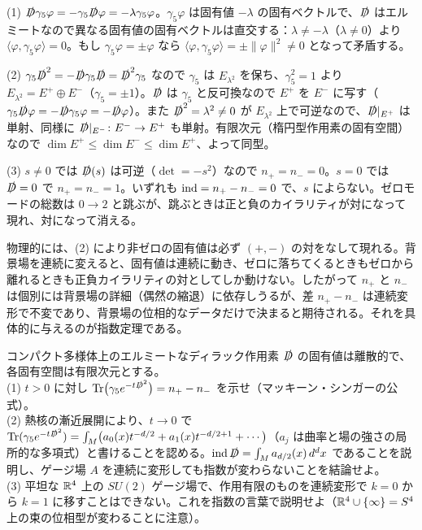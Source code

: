 \begin{solution}
(1) $\slashed D\gamma_5\varphi=-\gamma_5\slashed D\varphi=-\lambda\gamma_5\varphi$。$\gamma_5\varphi$ は固有値 $-\lambda$ の固有ベクトルで、$\slashed D$ はエルミートなので異なる固有値の固有ベクトルは直交する：$\lambda\neq-\lambda$（$\lambda\neq0$）より $\langle\varphi,\gamma_5\varphi\rangle=0$。もし $\gamma_5\varphi=\pm\varphi$ なら $\langle\varphi,\gamma_5\varphi\rangle=\pm\lVert\varphi\rVert^2\neq0$ となって矛盾する。

(2) $\gamma_5\slashed D^2=-\slashed D\gamma_5\slashed D=\slashed D^2\gamma_5$ なので $\gamma_5$ は $E_{\lambda^2}$ を保ち、$\gamma_5^2=1$ より $E_{\lambda^2}=E^+\oplus E^-$（$\gamma_5=\pm1$）。$\slashed D$ は $\gamma_5$ と反可換なので $E^+$ を $E^-$ に写す（$\gamma_5\slashed D\varphi=-\slashed D\gamma_5\varphi=-\slashed D\varphi$）。また $\slashed D^2=\lambda^2\ne0$ が $E_{\lambda^2}$ 上で可逆なので、$\slashed D|_{E^+}$ は単射、同様に $\slashed D|_{E^-}\colon E^-\to E^+$ も単射。有限次元（楕円型作用素の固有空間）なので $\dim E^+\le\dim E^-\le\dim E^+$、よって同型。

(3) $s\neq0$ では $\slashed D(s)$ は可逆（$\det=-s^2$）なので $n_+=n_-=0$。$s=0$ では $\slashed D=0$ で $n_+=n_-=1$。いずれも $\operatorname{ind}=n_+-n_-=0$ で、$s$ によらない。ゼロモードの総数は $0\to2$ と跳ぶが、跳ぶときは正と負のカイラリティが対になって現れ、対になって消える。

物理的には、(2) により非ゼロの固有値は必ず $(+,-)$ の対をなして現れる。背景場を連続に変えると、固有値は連続に動き、ゼロに落ちてくるときもゼロから離れるときも正負カイラリティの対としてしか動けない。したがって $n_+$ と $n_-$ は個別には背景場の詳細（偶然の縮退）に依存しうるが、差 $n_+-n_-$ は連続変形で不変であり、背景場の位相的なデータだけで決まると期待される。それを具体的に与えるのが指数定理である。
\end{solution}

\begin{problem}[難易度 B]\label{ch09-prob-mckean}
コンパクト多様体上のエルミートなディラック作用素 $\slashed D$ の固有値は離散的で、各固有空間は有限次元とする。\\
(1) $t>0$ に対し $\operatorname{Tr}\bigl(\gamma_5e^{-t\slashed D^2}\bigr)=n_+-n_-$ を示せ（マッキーン・シンガーの公式）。\\
(2) 熱核の漸近展開により、$t\to0$ で $\operatorname{Tr}(\gamma_5e^{-t\slashed D^2})=\int_M\bigl(a_0(x)t^{-d/2}+a_1(x)t^{-d/2+1}+\cdots\bigr)$（$a_j$ は曲率と場の強さの局所的な多項式）と書けることを認める。$\operatorname{ind}\slashed D=\int_Ma_{d/2}(x)\,d^dx$ であることを説明し、ゲージ場 $A$ を連続に変形しても指数が変わらないことを結論せよ。\\
(3) 平坦な $\mathbb{R}^4$ 上の $SU(2)$ ゲージ場で、作用有限のものを連続変形で $k=0$ から $k=1$ に移すことはできない。これを指数の言葉で説明せよ（$\mathbb{R}^4\cup\{\infty\}=S^4$ 上の束の位相型が変わることに注意）。
\end{problem}

